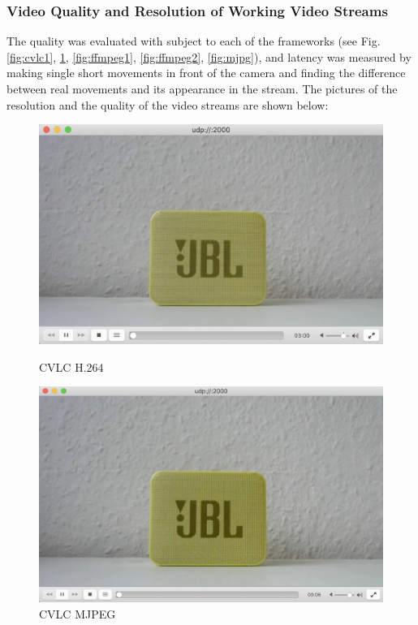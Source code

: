\subsubsection{Video Quality and Resolution of Working Video Streams}

The quality was evaluated with subject to each of the frameworks (see Fig. \ref{fig:cvlc1}, \ref{fig:cvlc2}, \ref{fig:ffmpeg1}, \ref{fig:ffmpeg2}, \ref{fig:mjpg}), and latency was measured by making single short movements in front of the camera and finding the difference between real movements and its appearance in the stream. The pictures of the resolution and the quality of the video streams are shown below: \par


\begin{figure}[ht]
\centering \begin{minipage}[b]{0.45\linewidth}
\includegraphics[width=\textwidth]{images/CVLC_H.264.png}
\caption{CVLC H.264} \label{fig:cvlc1}
\end{minipage}
\quad \begin{minipage}[b]{0.45\linewidth}
\includegraphics[width=\textwidth]{images/CVLC_MJPEG.png}
\caption{CVLC MJPEG} \label{fig:cvlc2}
\end{minipage}
\end{figure}

